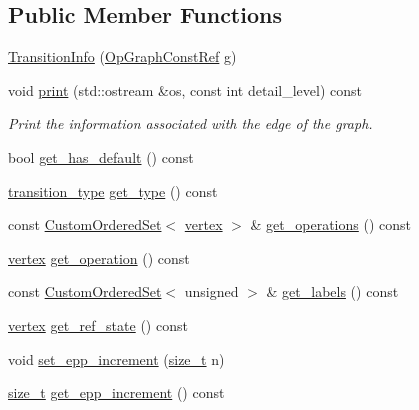 \subsection*{Public Member Functions}
\begin{DoxyCompactItemize}
\item 
\hyperlink{classTransitionInfo_a68fc209ccd3ea59a1ac92322babb90d8}{Transition\+Info} (\hyperlink{op__graph_8hpp_a9a0b240622c47584bee6951a6f5de746}{Op\+Graph\+Const\+Ref} g)
\item 
void \hyperlink{classTransitionInfo_a18cd68a222a448e60629d658803b9cf6}{print} (std\+::ostream \&os, const int detail\+\_\+level) const
\begin{DoxyCompactList}\small\item\em Print the information associated with the edge of the graph. \end{DoxyCompactList}\item 
bool \hyperlink{classTransitionInfo_a3f04888287c83e456a6ffa98b14270c0}{get\+\_\+has\+\_\+default} () const
\item 
\hyperlink{state__transition__graph_8hpp_a73ce4c522d9c8d45a7e1ab48c95a1710}{transition\+\_\+type} \hyperlink{classTransitionInfo_a803fb774294b2e87d448903333c1cae1}{get\+\_\+type} () const
\item 
const \hyperlink{classCustomOrderedSet}{Custom\+Ordered\+Set}$<$ \hyperlink{graph_8hpp_abefdcf0544e601805af44eca032cca14}{vertex} $>$ \& \hyperlink{classTransitionInfo_ac679038db4c2834abfba0b987d5f20d0}{get\+\_\+operations} () const
\item 
\hyperlink{graph_8hpp_abefdcf0544e601805af44eca032cca14}{vertex} \hyperlink{classTransitionInfo_a899a1478eac4949fd148de7d0d9f835f}{get\+\_\+operation} () const
\item 
const \hyperlink{classCustomOrderedSet}{Custom\+Ordered\+Set}$<$ unsigned $>$ \& \hyperlink{classTransitionInfo_a1f0d0f31652aa15ed6aedec50d4c59c9}{get\+\_\+labels} () const
\item 
\hyperlink{graph_8hpp_abefdcf0544e601805af44eca032cca14}{vertex} \hyperlink{classTransitionInfo_a15343bac3bce680f7e614490e7340c87}{get\+\_\+ref\+\_\+state} () const
\item 
void \hyperlink{classTransitionInfo_a12bd8feabc20ab2d67d16faa9319cd80}{set\+\_\+epp\+\_\+increment} (\hyperlink{tutorial__fpt__2017_2intro_2sixth_2test_8c_a7c94ea6f8948649f8d181ae55911eeaf}{size\+\_\+t} n)
\item 
\hyperlink{tutorial__fpt__2017_2intro_2sixth_2test_8c_a7c94ea6f8948649f8d181ae55911eeaf}{size\+\_\+t} \hyperlink{classTransitionInfo_a5ad763da3895e58add2bf0ee1c0bae06}{get\+\_\+epp\+\_\+increment} () const
\end{DoxyCompactItemize}
